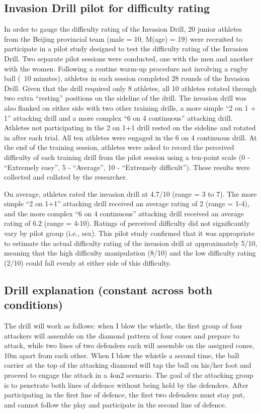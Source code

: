 \subsection{\label{app6:difficultyPilot}Invasion Drill pilot for difficulty rating}
In order to gauge the difficulty rating of the Invasion Drill, 20 junior athletes from the Beijing provincial team (male = 10,  M(age) = 19) were recruited to participate in a pilot study designed to test the difficulty rating of the Invasion Drill. Two separate pilot sessions were conducted, one with the men and another with the women. Following a routine warm-up procedure not involving a rugby ball (~10 minutes), athletes in each session completed 28 rounds of the Invasion Drill.  Given that the drill required only 8 athletes, all 10 athletes rotated through two extra ``resting'' positions on the sideline of the drill.  The invasion drill was also flanked on either side with two other  training drills, a more simple ``2 on 1 + 1'' attacking drill and a more complex ``6 on 4 continuous'' attacking drill.  Athletes not participating in the 2 on 1+1 drill rested on the sideline and rotated in after each trial.  All ten athletes were engaged in the 6 on 4 continuous drill. At the end of the training session, athletes were asked to record the perceived difficulty of each training drill from the pilot session using a ten-point scale (0 - ``Extremely easy'', 5 - ``Average'', 10 - ``Extremely difficult''). These results were collected and collated by the researcher.

On average, athletes rated the invasion drill at 4.7/10 (range = 3 to 7).  The more simple ``2 on 1+1'' attacking drill received an average rating of 2 (range = 1-4), and the more complex ``6 on 4 continuous'' attacking drill received an average rating of 6.2 (range = 4-10). Ratings of perceived difficulty did not significantly vary by pilot group (i.e., sex). This pilot study confirmed that it was appropriate to estimate the actual difficulty rating of the invasion drill at approximately 5/10, meaning that the high difficulty manipulation (8/10) and the low difficulty rating (2/10) could fall evenly at either side of this difficulty.




\subsection{\label{app6:drillExplanation}Drill explanation (constant across both conditions)}
The drill will work as follows:  when I blow the whistle, the first group of four attackers will assemble on the diamond pattern of four cones and prepare to attack, while two lines of two defenders each will assemble on the assigned cones, 10m apart from each other.  When I blow the whistle a second time, the ball carrier at the top of the attacking diamond will tap the ball on his/her foot and proceed to engage the attack in a 4on2 scenario.  The goal of the attacking group is to penetrate both lines of defence without being held by the defenders.  After participating in the first line of defence, the first two defenders must stay put, and cannot follow the play and participate in the second line of defence.

